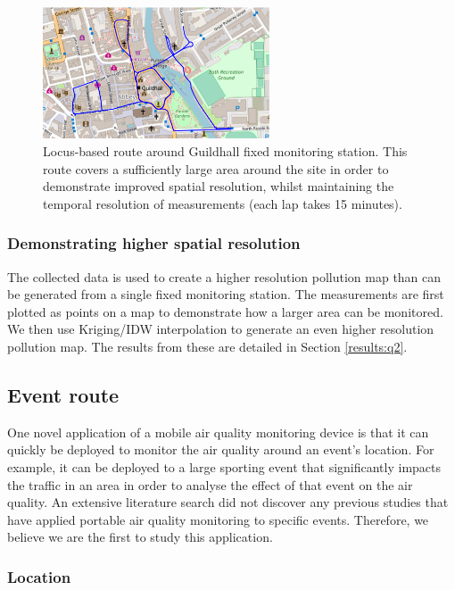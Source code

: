 \documentclass[11pt]{report}
\begin{document}
\begin{figure}[!tb]
\centering
\includegraphics[width=0.6\textwidth]{images/locus_route}
\caption[Locus-based route.]{Locus-based route around Guildhall fixed monitoring station. This route covers a sufficiently large area around the site in order to demonstrate improved spatial resolution, whilst maintaining the temporal resolution of measurements (each lap takes 15 minutes).}
\label{fig: locus_route}
\end{figure}

\subsubsection{Demonstrating higher spatial resolution}

The collected data is used to create a higher resolution pollution map than can be generated from a single fixed monitoring station. The measurements are first plotted as points on a map to demonstrate how a larger area can be monitored. We then use Kriging/IDW interpolation to generate an even higher resolution pollution map. The results from these are detailed in Section \ref{results:q2}.


\subsection{Event route} \label{sec:event}

One novel application of a mobile air quality monitoring device is that it can quickly be deployed to monitor the air quality around an event's location. For example, it can be deployed to a large sporting event that significantly impacts the traffic in an area in order to analyse the effect of that event on the air quality. An extensive literature search did not discover any previous studies that have applied portable air quality monitoring to specific events. Therefore, we believe we are the first to study this application.

\subsubsection{Location}
\end{document}
